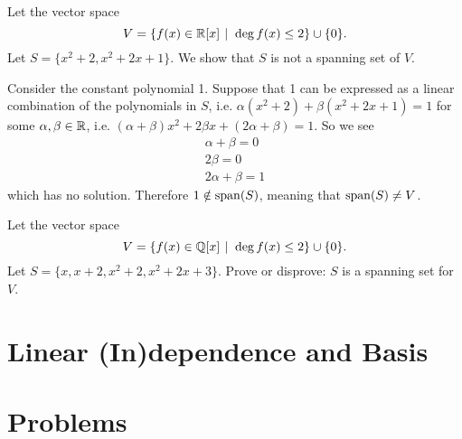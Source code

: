 \begin{example}
    Let the vector space
    \[
        V = \{f(x) \in \R[x] \vert \deg f(x) \leq 2\} \cup \{0\}.
    \]
    Let $S = \{x^2 + 2, x^2 + 2x + 1\}$. We show that $S$ is not a spanning set of $V$.

    Consider the constant polynomial 1. Suppose that 1 can be expressed as a linear combination of the polynomials in $S$, i.e. $\alpha(x^2 + 2) + \beta(x^2+2x+1) = 1$ for some $\alpha, \beta \in \mathbb{R}$, i.e. $(\alpha + \beta)x^2 + 2\beta x + (2\alpha + \beta) = 1$. So we see
    \begin{align*}
        \alpha + \beta = 0\\
        2\beta = 0\\
        2\alpha + \beta = 1
    \end{align*}
    which has no solution. Therefore $1 \notin \mathrm{span}(S)$, meaning that $\mathrm{span}(S) \neq V$.
\end{example}

\begin{exercise}
    Let the vector space
    \[
        V = \{f(x) \in \Q[x] \vert \deg f(x) \leq 2\} \cup \{0\}.
    \]
    Let $S = \{x, x + 2, x^2 + 2, x^2 + 2x + 3\}$. Prove or disprove: $S$ is a spanning set for $V$.
\end{exercise}

\newpage

\section{Linear (In)dependence and Basis}

\newpage

\section{Problems}

